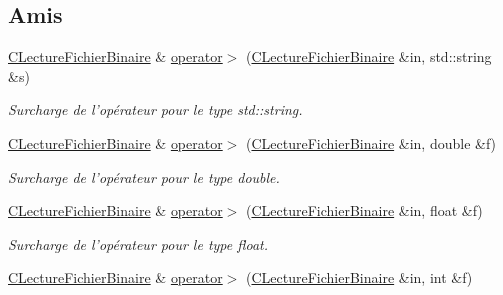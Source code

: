 \subsection*{Amis}
\begin{DoxyCompactItemize}
\item 
\hypertarget{class_c_lecture_fichier_binaire_abc9f4d65dcf682dbf572f5110a00252d}{\hyperlink{class_c_lecture_fichier_binaire}{C\-Lecture\-Fichier\-Binaire} \& \hyperlink{class_c_lecture_fichier_binaire_abc9f4d65dcf682dbf572f5110a00252d}{operator$>$} (\hyperlink{class_c_lecture_fichier_binaire}{C\-Lecture\-Fichier\-Binaire} \&in, std\-::string \&s)}\label{class_c_lecture_fichier_binaire_abc9f4d65dcf682dbf572f5110a00252d}

\begin{DoxyCompactList}\small\item\em Surcharge de l'opérateur pour le type {\itshape std\-::string}. \end{DoxyCompactList}\item 
\hypertarget{class_c_lecture_fichier_binaire_a8b4123b210cccf9da0d2eb60dc19b8a0}{\hyperlink{class_c_lecture_fichier_binaire}{C\-Lecture\-Fichier\-Binaire} \& \hyperlink{class_c_lecture_fichier_binaire_a8b4123b210cccf9da0d2eb60dc19b8a0}{operator$>$} (\hyperlink{class_c_lecture_fichier_binaire}{C\-Lecture\-Fichier\-Binaire} \&in, double \&f)}\label{class_c_lecture_fichier_binaire_a8b4123b210cccf9da0d2eb60dc19b8a0}

\begin{DoxyCompactList}\small\item\em Surcharge de l'opérateur pour le type {\itshape double}. \end{DoxyCompactList}\item 
\hypertarget{class_c_lecture_fichier_binaire_a8727572665715de99f2908c711e45114}{\hyperlink{class_c_lecture_fichier_binaire}{C\-Lecture\-Fichier\-Binaire} \& \hyperlink{class_c_lecture_fichier_binaire_a8727572665715de99f2908c711e45114}{operator$>$} (\hyperlink{class_c_lecture_fichier_binaire}{C\-Lecture\-Fichier\-Binaire} \&in, float \&f)}\label{class_c_lecture_fichier_binaire_a8727572665715de99f2908c711e45114}

\begin{DoxyCompactList}\small\item\em Surcharge de l'opérateur pour le type {\itshape float}. \end{DoxyCompactList}\item 
\hypertarget{class_c_lecture_fichier_binaire_a327898e8bcb11d00bdb07e3e8bd361bd}{\hyperlink{class_c_lecture_fichier_binaire}{C\-Lecture\-Fichier\-Binaire} \& \hyperlink{class_c_lecture_fichier_binaire_a327898e8bcb11d00bdb07e3e8bd361bd}{operator$>$} (\hyperlink{class_c_lecture_fichier_binaire}{C\-Lecture\-Fichier\-Binaire} \&in, int \&f)}\label{class_c_lecture_fichier_binaire_a327898e8bcb11d00bdb07e3e8bd361bd}


\end{DoxyCompactItemize}
